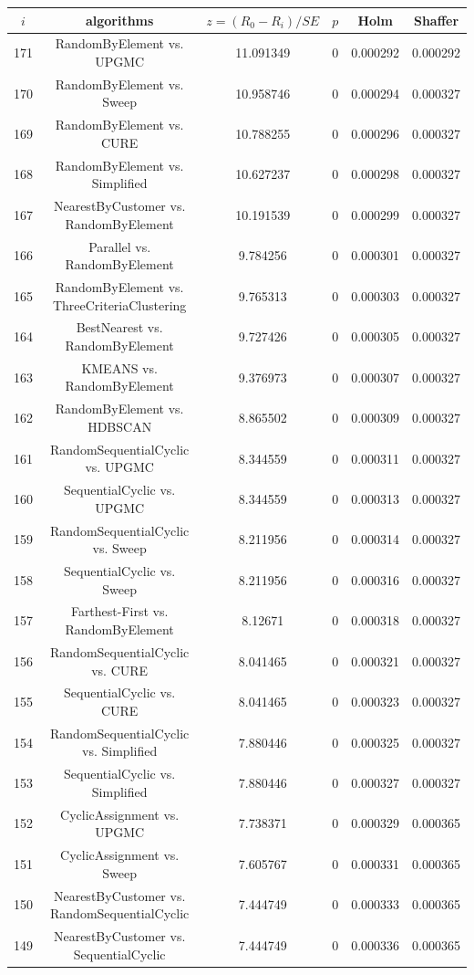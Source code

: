 \documentclass[a4paper,10pt]{article}
\begin{document}
\begin{landscape}
\begin{table}[!htp]
\centering\scriptsize
\begin{tabular}{cccccc}
$i$&algorithms&$z=(R_0 - R_i)/SE$&$p$&Holm&Shaffer\\
\hline171&RandomByElement vs. UPGMC&11.091349&0&0.000292&0.000292\\
170&RandomByElement vs. Sweep&10.958746&0&0.000294&0.000327\\
169&RandomByElement vs. CURE&10.788255&0&0.000296&0.000327\\
168&RandomByElement vs. Simplified&10.627237&0&0.000298&0.000327\\
167&NearestByCustomer vs. RandomByElement&10.191539&0&0.000299&0.000327\\
166&Parallel vs. RandomByElement&9.784256&0&0.000301&0.000327\\
165&RandomByElement vs. ThreeCriteriaClustering&9.765313&0&0.000303&0.000327\\
164&BestNearest vs. RandomByElement&9.727426&0&0.000305&0.000327\\
163&KMEANS vs. RandomByElement&9.376973&0&0.000307&0.000327\\
162&RandomByElement vs. HDBSCAN&8.865502&0&0.000309&0.000327\\
161&RandomSequentialCyclic vs. UPGMC&8.344559&0&0.000311&0.000327\\
160&SequentialCyclic vs. UPGMC&8.344559&0&0.000313&0.000327\\
159&RandomSequentialCyclic vs. Sweep&8.211956&0&0.000314&0.000327\\
158&SequentialCyclic vs. Sweep&8.211956&0&0.000316&0.000327\\
157&Farthest-First vs. RandomByElement&8.12671&0&0.000318&0.000327\\
156&RandomSequentialCyclic vs. CURE&8.041465&0&0.000321&0.000327\\
155&SequentialCyclic vs. CURE&8.041465&0&0.000323&0.000327\\
154&RandomSequentialCyclic vs. Simplified&7.880446&0&0.000325&0.000327\\
153&SequentialCyclic vs. Simplified&7.880446&0&0.000327&0.000327\\
152&CyclicAssignment vs. UPGMC&7.738371&0&0.000329&0.000365\\
151&CyclicAssignment vs. Sweep&7.605767&0&0.000331&0.000365\\
150&NearestByCustomer vs. RandomSequentialCyclic&7.444749&0&0.000333&0.000365\\
149&NearestByCustomer vs. SequentialCyclic&7.444749&0&0.000336&0.000365\\

\end{tabular}
\end{table}
\end{landscape}
\end{document}
